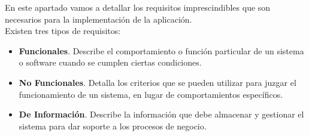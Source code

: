 \documentclass[../../main.tex]{subfiles}
\begin{document}
En este apartado vamos a detallar los requisitos imprescindibles que son necesarios para la implementación de la aplicación. \\

Existen tres tipos de requisitos:

\begin{itemize}
    \item \textbf{Funcionales}. Describe el comportamiento o función particular de un sistema o software cuando se cumplen ciertas condiciones.
    \item \textbf{No Funcionales}. Detalla los criterios que se pueden utilizar para juzgar el funcionamiento de un sistema, en lugar de comportamientos específicos.
    \item \textbf{De Información}. Describe la información que debe almacenar y gestionar el sistema para dar soporte a los procesos de negocio.
\end{itemize}
\end{document}
